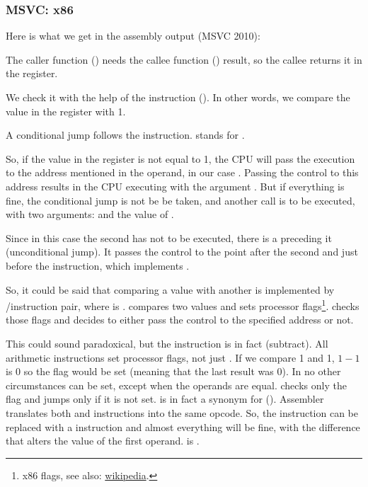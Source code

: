 \subsubsection{MSVC: x86}

Here is what we get in the assembly output (MSVC 2010):



The \gls{caller} function (\main) needs the \gls{callee} function (\scanf) result, 
so the \gls{callee} returns it in the \EAX register.

We check it with the help of the instruction  (). In other words, we compare the value in the \EAX register with 1.

A \JNE conditional jump follows the \CMP instruction. \JNE stands for .

So, if the value in the \EAX register is not equal to 1, the \ac{CPU} will pass the execution to the address mentioned in the \JNE operand, in our case .
Passing the control to this address results in the \ac{CPU} executing \printf with the argument .
But if everything is fine, the conditional jump is not be be taken, and another \printf call is to be executed, with two arguments:  and the value of .

Since in this case the second \printf has not to be executed, there is a \JMP preceding it (unconditional jump). 
It passes the control to the point after the second \printf and just before the  instruction, which implements .

So, it could be said that comparing a value with another is  implemented by \CMP/\Jcc instruction pair, where  is .
\CMP compares two values and sets processor flags\footnote{x86 flags, see also: \href{http://go.yurichev.com/17120}{wikipedia}.}.
\Jcc checks those flags and decides to either pass the control to the specified address or not.

\label{CMPandSUB}
This could sound paradoxical, but the \CMP instruction is in fact \SUB (subtract).
All arithmetic instructions set processor flags, not just \CMP.
If we compare 1 and 1, $1-1$ is 0 so the \ZF flag would be set (meaning that the last result was 0).
In no other circumstances \ZF can be set, except when the operands are equal.
\JNE checks only the \ZF flag and jumps only if it is not set.  \JNE is in fact a synonym for \JNZ ().
Assembler translates both \JNE and \JNZ instructions into the same opcode.
So, the \CMP instruction can be replaced with a \SUB instruction and almost everything will be fine, with the difference that \SUB alters the value of the first operand.
\CMP is .

